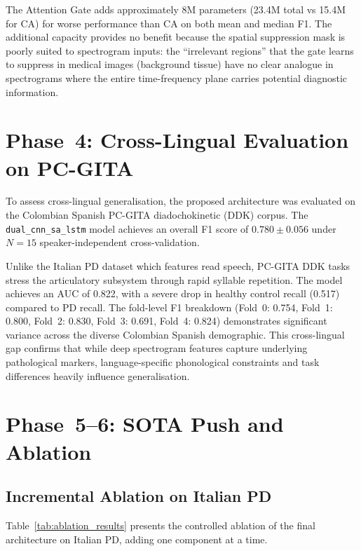 \documentclass[oneside,openany]{final_report}
\newcommand{\dualcnn}{\texttt{dual\_cnn\_sa\_lstm}}
\begin{document}
The Attention Gate adds approximately 8M parameters (23.4M total vs 15.4M for CA) for worse performance than CA on both mean and median F1. The additional capacity provides no benefit because the spatial suppression mask is poorly suited to spectrogram inputs: the ``irrelevant regions'' that the gate learns to suppress in medical images (background tissue) have no clear analogue in spectrograms where the entire time-frequency plane carries potential diagnostic information.

\section{Phase~4: Cross-Lingual Evaluation on PC-GITA}

To assess cross-lingual generalisation, the proposed architecture was evaluated on the Colombian Spanish PC-GITA diadochokinetic (DDK) corpus. The \dualcnn{} model achieves an overall F1 score of $0.780 \pm 0.056$ under $N\!=\!15$ speaker-independent cross-validation. 

Unlike the Italian PD dataset which features read speech, PC-GITA DDK tasks stress the articulatory subsystem through rapid syllable repetition. The model achieves an AUC of 0.822, with a severe drop in healthy control recall (0.517) compared to PD recall. The fold-level F1 breakdown (Fold~0: 0.754, Fold~1: 0.800, Fold~2: 0.830, Fold~3: 0.691, Fold~4: 0.824) demonstrates significant variance across the diverse Colombian Spanish demographic. This cross-lingual gap confirms that while deep spectrogram features capture underlying pathological markers, language-specific phonological constraints and task differences heavily influence generalisation.

\section{Phase~5--6: SOTA Push and Ablation}

\subsection{Incremental Ablation on Italian PD}

Table~\ref{tab:ablation_results} presents the controlled ablation of the final architecture on Italian PD, adding one component at a time.
\end{document}
